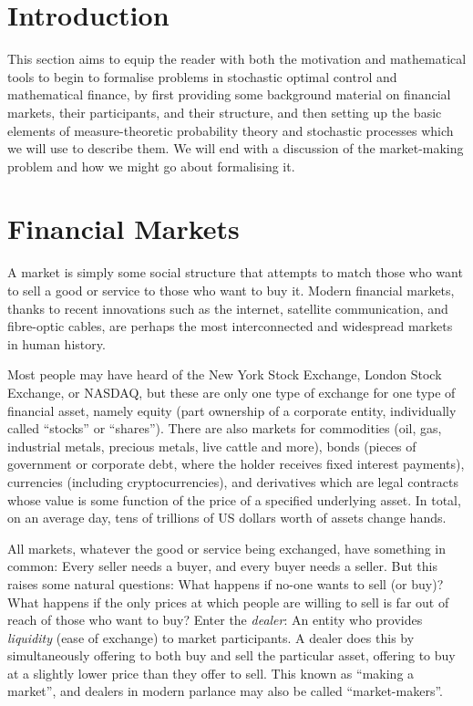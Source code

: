 \section{Introduction}
This section aims to equip the reader with both the motivation and mathematical tools to begin to formalise problems in stochastic optimal control 
and mathematical finance, by first providing some background material on financial markets, their participants, and their structure, 
and then setting up the basic elements of measure-theoretic probability theory and stochastic processes which we will use to describe them. 
We will end with a discussion of the market-making problem and how we might go about formalising it.

\section{Financial Markets}
A market is simply some social structure that attempts to match those who want to sell a good or service to those who want to buy it. 
Modern financial markets, thanks to recent innovations such as the internet, satellite communication, and fibre-optic cables, 
are perhaps the most interconnected and widespread markets in human history. 

Most people may have heard of the New York Stock Exchange, London Stock Exchange, or NASDAQ, 
but these are only one type of exchange for one type of financial asset, namely equity 
(part ownership of a corporate entity, individually called ``stocks'' or ``shares''). There are also markets for commodities 
(oil, gas, industrial metals, precious metals, live cattle and more), bonds (pieces of government or corporate debt, 
where the holder receives fixed interest payments), currencies (including cryptocurrencies), 
and derivatives which are legal contracts whose value is some function of the price of a specified underlying asset. 
In total, on an average day, tens of trillions of US dollars worth of assets change hands.

All markets, whatever the good or service being exchanged, have something in common: Every seller needs a buyer, 
and every buyer needs a seller. But this raises some natural questions: What happens if no-one wants to sell (or buy)? 
What happens if the only prices at which people are willing to sell is far out of reach of those who want to buy? 
Enter the \textit{dealer}: An entity who provides \textit{liquidity} (ease of exchange) to market participants. 
A dealer does this by simultaneously offering to both buy and sell the particular asset, offering to buy at a slightly lower price than they offer to sell. 
This known as ``making a market'', and dealers in modern parlance may also be called ``market-makers''.

